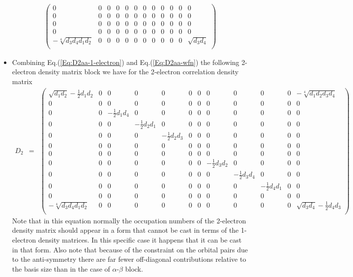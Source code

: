 \documentclass[aip,graphicx]{revtex4-1}
\begin{document}
\begin{itemize}
\begin{eqnarray}
\begin{pmatrix}
         0 & 0 & 0 & 0 & 0 & 0 & 0 & 0 & 0 & 0 & 0 & 0 \\
         0 & 0 & 0 & 0 & 0 & 0 & 0 & 0 & 0 & 0 & 0 & 0 \\
         0 & 0 & 0 & 0 & 0 & 0 & 0 & 0 & 0 & 0 & 0 & 0 \\
         0 & 0 & 0 & 0 & 0 & 0 & 0 & 0 & 0 & 0 & 0 & 0 \\
         -\sqrt[4]{d_{3}d_{4}d_{1}d_{2}} & 0 & 0 & 0 & 0 & 0 & 0 & 0 & 0 & 0 & 0 & \sqrt{d_{3}d_{4}} \\
         \end{pmatrix} 
         \label{Eq:D2aa-2el-4orb}
         \end{eqnarray}
\item Combining Eq.(\ref{Eq:D2aa-1-electron}) and Eq.(\ref{Eq:D2aa-wfn}) the following 2-electron
         density matrix block we have for the 2-electron correlation density matrix
         \tiny
         \begin{eqnarray}
         \label{Eq:D2aa-correlation}
         D_2 &=&
         \begin{pmatrix}
         \sqrt{d_{1}d_{2}}-\frac{1}{2}d_1 d_2 & 0 & 0 & 0 & 0 & 0 & 0 & 0 & 0 & 0 & 0 & -\sqrt[4]{d_{1}d_{2}d_{3}d_{4}} \\
         0 & 0 & 0 & 0 & 0 & 0 & 0 & 0 & 0 & 0 & 0 & 0 \\
         0 & 0 & -\frac{1}{2}d_1 d_4 & 0 & 0 & 0 & 0 & 0 & 0 & 0 & 0 & 0 \\
         0 & 0 & 0 & -\frac{1}{2}d_2 d_1 & 0 & 0 & 0 & 0 & 0 & 0 & 0 & 0 \\
         0 & 0 & 0 & 0 & -\frac{1}{2}d_2 d_3 & 0 & 0 & 0 & 0 & 0 & 0 & 0 \\
         0 & 0 & 0 & 0 & 0 & 0 & 0 & 0 & 0 & 0 & 0 & 0 \\
         0 & 0 & 0 & 0 & 0 & 0 & 0 & 0 & 0 & 0 & 0 & 0 \\
         0 & 0 & 0 & 0 & 0 & 0 & 0 & -\frac{1}{2}d_3 d_2 & 0 & 0 & 0 & 0 \\
         0 & 0 & 0 & 0 & 0 & 0 & 0 & 0 & -\frac{1}{2}d_3 d_4 & 0 & 0 & 0  \\
         0 & 0 & 0 & 0 & 0 & 0 & 0 & 0 & 0 & -\frac{1}{2}d_4 d_1 & 0 & 0  \\
         0 & 0 & 0 & 0 & 0 & 0 & 0 & 0 & 0 & 0 & 0 & 0  \\
         -\sqrt[4]{d_{3}d_{4}d_{1}d_{2}} & 0 & 0 & 0 & 0 & 0 & 0 & 0 & 0 & 0 & 0 & \sqrt{d_{3}d_{4}}-\frac{1}{2}d_4 d_3  \\
         \end{pmatrix}
         \end{eqnarray}
         \normalsize
         Note that in this equation normally the occupation numbers of the 2-electron density matrix should appear
         in a form that cannot be cast in terms of the 1-electron density matrices. In this specific case it happens that
         it can be cast in that form. Also note that because of the constraint on the orbital pairs due to the
         anti-symmetry there are far fewer off-diagonal contributions relative to the basis size than in the case of
         $\alpha$-$\beta$ block.
\end{itemize}
\end{document}

